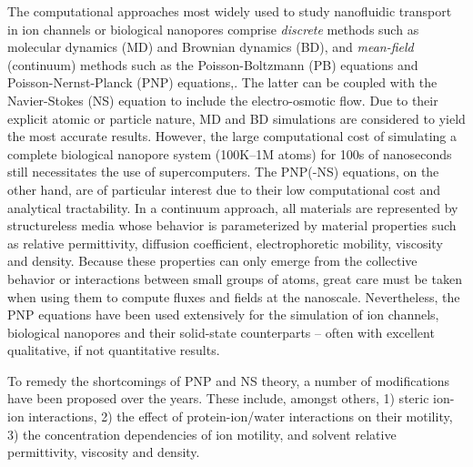 \documentclass[journal=ancac3,manuscript=article,etalmode=truncate,maxauthors=0,layout=twocolumn]{achemso}
\begin{document}
The computational approaches most widely used to study nanofluidic transport in ion channels or biological
nanopores comprise \emph{discrete} methods such as molecular dynamics (MD)\cite{Lynden-Bell-1996,
Allen-1999,Aksimentiev-2005,Luan-2008,Bhattacharya-2011,Zhang-2014,DiMarino-2015,Belkin-2016} and Brownian
dynamics (BD),\cite{Schirmer-1999,Im-2002,Noskov-2004,Millar-2008,Egwolf-2010,DeBiase-2015,Pederson-2015}
and \emph{mean-field} (continuum) methods such as the Poisson-Boltzmann (PB) equations\cite{Grochowski-2008,
Baldessari-2008-1} and Poisson-Nernst-Planck (PNP) equations,\cite{Eisenberg-1996,Gillespie-2002,
Simakov-2010}. The latter can be coupled with the Navier-Stokes (NS) equation to include the electro-osmotic
flow.\cite{Lu-2012,Pederson-2015} Due to their explicit atomic or particle nature, MD and BD simulations are
considered to yield the most accurate results. However, the large computational cost of simulating a complete
biological nanopore system (100K--1M atoms) for 100s of nanoseconds still necessitates the use of
supercomputers.\cite{Aksimentiev-2005,Bhattacharya-2011} The PNP(-NS) equations, on the other hand, are of
particular interest due to their low computational cost and analytical tractability. In a continuum approach,
all materials are represented by structureless media whose behavior is parameterized by material properties
such as relative permittivity, diffusion coefficient, electrophoretic mobility, viscosity and density. Because
these properties can only emerge from the collective behavior or interactions between small groups of atoms,
great care must be taken when using them to compute fluxes and fields at the
nanoscale.\cite{Corry-2000,Collins-2012} Nevertheless, the PNP equations have been used extensively for the
simulation of ion channels,\cite{Im-2002,Furini-2006,Liu-2015} biological
nanopores\cite{Simakov-2010,Pederson-2015,Aguilella-Arzo-2017,Simakov-2018} and their solid-state
counterparts\cite{Cervera-2005,White-2008,Chaudhry-2014,Laohakunakorn-2015} -- often with excellent
qualitative, if not quantitative results.\cite{Maffeo-2012,Thomas-2014,Kim-2015}

To remedy the shortcomings of PNP and NS theory, a number of modifications have been proposed over the years.
These include, amongst others, 1) steric ion-ion interactions, 2) the effect of protein-ion/water interactions
on their motility, 3) the concentration dependencies of ion motility, and solvent relative permittivity,
viscosity and density.
\end{document}
